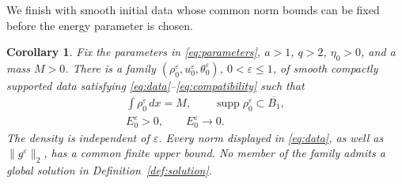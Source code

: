 \documentclass[11pt,letterpaper]{article}
\numberwithin{equation}{section}
\newtheorem{corollary}[theorem]{Corollary}
\theoremstyle{definition}
\newcommand{\dd}{\,dx}
\newcommand{\supp}{\operatorname{supp}}
\newcommand{\norm}[2]{\lVert#1\rVert_{#2}}
\begin{document}
We finish with smooth initial data whose common norm bounds can be
fixed before the energy parameter is chosen.

\begin{corollary}\label{cor:smallenergy}
Fix the parameters in \eqref{eq:parameters}, $a>1$, $q>2$,
$\eta_0>0$, and a mass $M>0$. There is a family
$(\rho_0^\varepsilon,u_0^\varepsilon,\theta_0^\varepsilon)$,
$0<\varepsilon\le1$, of smooth compactly supported data satisfying
\eqref{eq:data}--\eqref{eq:compatibility} such that
\begin{equation}
 \begin{gathered}
 \int\rho_0^\varepsilon\dd=M,\qquad
 \supp\rho_0^\varepsilon\subset\overline{B_1},\\
 E_0^\varepsilon>0,\qquad E_0^\varepsilon\longrightarrow0.
 \end{gathered}
 \label{eq:familyproperties}
\end{equation}
The density is independent of $\varepsilon$. Every norm displayed
in \eqref{eq:data}, as well as $\norm{g^\varepsilon}{2}$, has a
common finite upper bound. No member of the family admits a global
solution in Definition~\ref{def:solution}.
\end{corollary}
\end{document}
